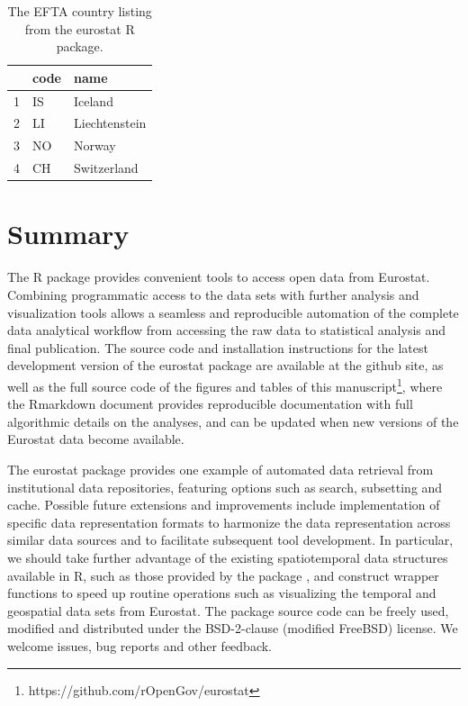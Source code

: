 \begin{table}[b]
\centering
\begin{tabular}{rll}
\toprule
  \hline
  & code & name \\ 
  \hline
  1 & IS & Iceland \\ 
  2 & LI & Liechtenstein \\ 
  3 & NO & Norway \\ 
  4 & CH & Switzerland \\ 
   \hline
\bottomrule   
\end{tabular}
\caption{The EFTA country listing from the eurostat R package.}
\label{tab:efta}
\end{table}




\section{Summary}

The  R package provides convenient tools to access open data
from Eurostat. Combining programmatic access to the data sets with
further analysis and visualization tools allows a seamless and
reproducible automation of the complete data analytical workflow from
accessing the raw data to statistical analysis and final
publication. The source code and installation instructions for the
latest development version of the eurostat package are available at
the github site, as well as the full source code of the figures and
tables of this manuscript\footnote{https://github.com/rOpenGov/eurostat},
where the Rmarkdown document provides reproducible documentation with
full algorithmic details on the analyses, and can be updated when new
versions of the Eurostat data become available.

The eurostat package provides one example of automated data retrieval
from institutional data repositories, featuring options such as
search, subsetting and cache. Possible future extensions and
improvements include implementation of specific data representation
formats to harmonize the data representation across similar data
sources and to facilitate subsequent tool development. In particular,
we should take further advantage of the existing spatiotemporal data
structures available in R, such as those provided by
the  package \citep{spacetime}, and construct
wrapper functions to speed up routine operations such as visualizing
the temporal and geospatial data sets from Eurostat. The package
source code can be freely used, modified and distributed under the
BSD-2-clause (modified FreeBSD) license. We welcome issues, bug
reports and other feedback.


